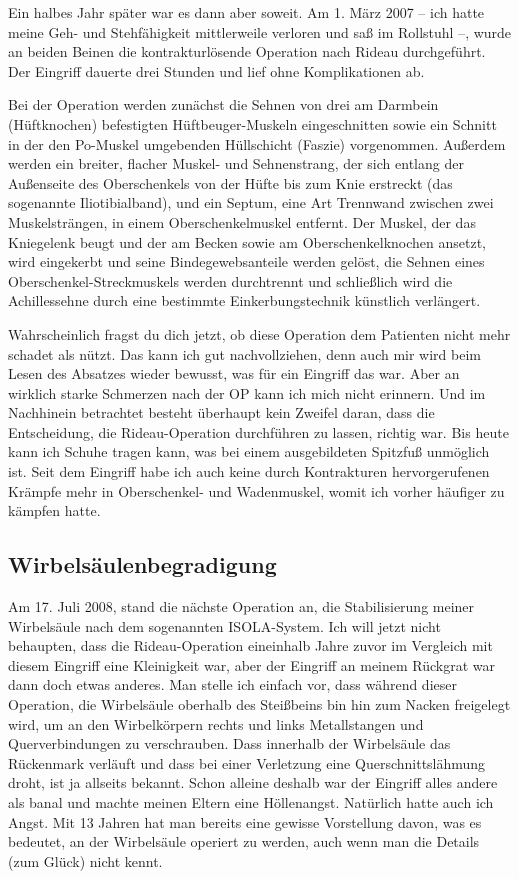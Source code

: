 \documentclass[fontsize=14pt,a4paper,headinclude,DIV=calc,automark]{scrbook}
\begin{document}
Ein halbes Jahr später war es dann aber soweit. Am 1. März 2007 – ich hatte meine Geh- und Stehfähigkeit mittlerweile verloren und saß im Rollstuhl –, wurde an beiden Beinen die kontrakturlösende Operation nach Rideau durchgeführt. Der Eingriff dauerte drei Stunden und lief ohne Komplikationen ab.

Bei der Operation werden zunächst die Sehnen von drei am Darmbein (Hüftknochen) befestigten Hüftbeuger-Muskeln eingeschnitten sowie ein Schnitt in der den Po-Muskel umgebenden Hüllschicht (Faszie) vorgenommen. Außerdem werden ein breiter, flacher Muskel- und Sehnenstrang, der sich entlang der Außenseite des Oberschenkels von der Hüfte bis zum Knie erstreckt (das sogenannte Iliotibialband), und ein Septum, eine Art Trennwand zwischen zwei Muskelsträngen, in einem Oberschenkelmuskel entfernt. Der Muskel, der das Kniegelenk beugt und der am Becken sowie am Oberschenkelknochen ansetzt, wird eingekerbt und seine Bindegewebsanteile werden gelöst, die Sehnen eines Oberschenkel-Streckmuskels werden durchtrennt und schließlich wird die Achillessehne durch eine bestimmte Einkerbungstechnik künstlich verlängert.

Wahrscheinlich fragst du dich jetzt, ob diese Operation dem Patienten nicht mehr schadet als nützt. Das kann ich gut nachvollziehen, denn auch mir wird beim Lesen des Absatzes wieder bewusst, was für ein Eingriff das war. Aber an wirklich starke Schmerzen nach der OP kann ich mich nicht erinnern. Und im Nachhinein betrachtet besteht überhaupt kein Zweifel daran, dass die Entscheidung, die Rideau-Operation durchführen zu lassen, richtig war. Bis heute kann ich Schuhe tragen kann, was bei einem ausgebildeten Spitzfuß unmöglich ist. Seit dem Eingriff habe ich auch keine durch Kontrakturen hervorgerufenen Krämpfe mehr in Oberschenkel- und Wadenmuskel, womit ich vorher häufiger zu kämpfen hatte.

\subsection{Wirbelsäulenbegradigung}

Am 17. Juli 2008, stand die nächste Operation an, die Stabilisierung meiner Wirbelsäule nach dem sogenannten ISOLA-System. Ich will jetzt nicht behaupten, dass die Rideau-Operation eineinhalb Jahre zuvor im Vergleich mit diesem Eingriff eine Kleinigkeit war, aber der Eingriff an meinem Rückgrat war dann doch etwas anderes. Man stelle ich einfach vor, dass während dieser Operation, die Wirbelsäule oberhalb des Steißbeins bin hin zum Nacken freigelegt wird, um an den Wirbelkörpern rechts und links Metallstangen und Querverbindungen zu verschrauben. Dass innerhalb der Wirbelsäule das Rückenmark verläuft und dass bei einer Verletzung eine Querschnittslähmung droht, ist ja allseits bekannt. Schon alleine deshalb war der Eingriff alles andere als banal und machte meinen Eltern eine Höllenangst. Natürlich hatte auch ich Angst. Mit 13 Jahren hat man bereits eine gewisse Vorstellung davon, was es bedeutet, an der Wirbelsäule operiert zu werden, auch wenn man die Details (zum Glück) nicht kennt.
\end{document}
